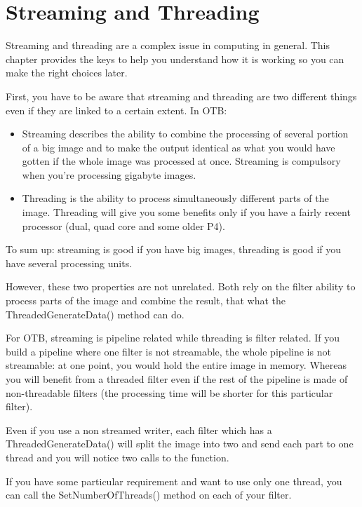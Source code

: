 \chapter{Streaming and Threading}
\label{sec:StreamingAndThreading}


Streaming and threading are a complex issue in computing in general. This
chapter provides the keys to help you understand how it is working so you can
make the right choices later.

First, you have to be aware that streaming and threading are two different
things even if they are linked to a certain extent. In OTB:

\begin{itemize}
\item Streaming describes the ability to combine the processing of several
portion of a big image and to make the output identical as what you would have
gotten if the whole image was processed at once. Streaming is compulsory when
you're processing gigabyte images. 
\item Threading is the ability to process simultaneously different parts of the
image. Threading will give you some benefits only if you have a fairly recent
processor (dual, quad core and some older P4).
\end{itemize}



To sum up: streaming is good if you have big images, threading is good if you
have several processing units.

However, these two properties are not unrelated. Both rely on the filter ability
to process parts of the image and combine the result, that what the
ThreadedGenerateData() method can do.

For OTB, streaming is pipeline related while threading is filter related. If you
build a pipeline where one filter is not streamable, the whole pipeline is not
streamable: at one point, you would hold the entire image in memory. Whereas you
will benefit from a threaded filter even if the rest of the pipeline is made of
non-threadable filters (the processing time will be shorter for this particular
filter).


Even if you use a non streamed writer, each filter which has a
ThreadedGenerateData() will split the image into two and send each part to one
thread and you will notice two calls to the function.

If you have some particular requirement and want to use only one thread, you can
call the SetNumberOfThreads() method on each of your filter. 

%